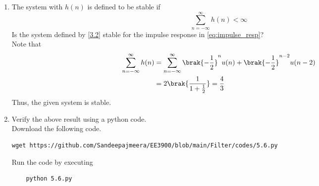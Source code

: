\documentclass[journal,12pt,twocolumn]{IEEEtran}
\renewcommand\thesection{\arabic{section}}
\begin{document}
\begin{enumerate}[label=\thesection.\arabic*
,ref=\thesection.\theenumi]
Therefore, $h(n)$ is convergent which implies that it is bounded.
\item The system with $h(n)$ is defined to be stable if
\begin{equation}
\sum_{n=-\infty}^{\infty}h(n) < \infty
\end{equation}
Is the system defined by \eqref{3.2} stable for the impulse response in \eqref{eq:impulse_resp}?\\
%
\solution Note that
\begin{align}
	\sum_{n=-\infty}^\infty h(n) &= \sum_{n=-\infty}^\infty \brak{-\frac{1}{2}}^nu(n)+\brak{-\frac{1}{2}}^{n-2}u(n-2)\\
	&= 2\brak{\frac{1}{1+\frac{1}{2}}} = \frac{4}{3}
\end{align}
Thus, the given system is stable.
\item Verify the above result using a python code.\\
\solution Download the following code.
\begin{lstlisting}
wget https://github.com/Sandeepajmeera/EE3900/blob/main/Filter/codes/5.6.py
\end{lstlisting}

Run the code by executing
\begin{lstlisting}
	python 5.6.py
\end{lstlisting}


\end{enumerate}
\end{document}
